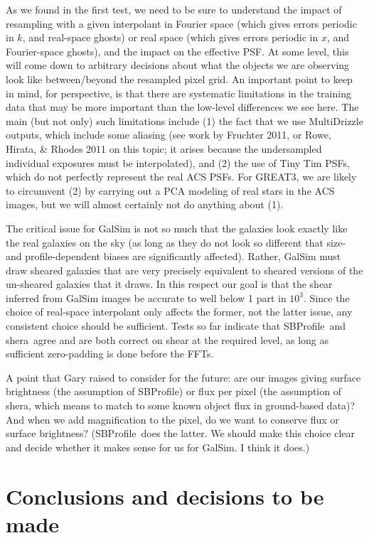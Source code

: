 \documentclass[preprint]{aastex}
\newcommand{\shera}{{\sc shera}}
\newcommand{\sbp}{SBProfile}
\begin{document}
As we found in the first test, we need to be sure to understand the impact of
resampling with a given interpolant in Fourier space (which gives
errors periodic in $k$, and real-space ghosts) or real space (which
gives errors periodic in $x$, and Fourier-space ghosts), and the
impact on the effective PSF.  At some level, this will come down to arbitrary decisions about what
the objects we are observing look like between/beyond the resampled pixel grid.  An important point
to keep in mind, for perspective, is that there are systematic limitations in the training data that
may be more important than the low-level differences we see here.  The main (but not only) such
limitations include (1) the fact that we use MultiDrizzle outputs, which include some aliasing (see
work by Fruchter 2011, or Rowe, Hirata, \& Rhodes 2011 on this topic; it arises because the undersampled individual exposures must be
interpolated), and (2) the use of Tiny Tim PSFs, which do not perfectly represent the real ACS
PSFs.  For GREAT3, we are likely to circumvent (2) by carrying out a PCA modeling of real stars in
the ACS images, but we will almost certainly not do anything about (1). 

The critical issue for GalSim is not so much that the galaxies look
exactly like the real galaxies on the sky (as long as they do not look
so different that size- and profile-dependent biases are significantly
affected). Rather, GalSim must draw
sheared galaxies that are very precisely equivalent to sheared
versions of the un-sheared galaxies that it draws.  In this respect
our goal is that the shear inferred from GalSim images be accurate to
well below 1 part in $10^3$.  Since the choice of real-space
interpolant only affects the former, not the latter issue, any
consistent choice should be sufficient.  Tests so far indicate that
\sbp\ and \shera\ agree and are both correct on shear at the required
level, as long as sufficient zero-padding is done before the FFTs.

A point that Gary raised to consider for the future: are our images
giving surface brightness (the assumption of \sbp) or flux per pixel
(the assumption of \shera, which means to match to some known object
flux in ground-based data)?  And when we add magnification to the
pixel, do we want to conserve flux or surface brightness?  (\sbp\ does
the latter.  We should make this choice clear and decide whether it
makes sense for us for GalSim.  I think it does.)

\section{Conclusions and decisions to be made}
\end{document}
